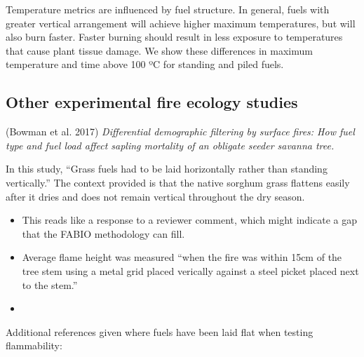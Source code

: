 \documentclass[11pt,a4paper]{article}
\begin{document}
Temperature metrics are influenced by fuel structure. In general, fuels
with greater vertical arrangement will achieve higher maximum
temperatures, but will also burn faster. Faster burning should result in
less exposure to temperatures that cause plant tissue damage. We show
these differences in maximum temperature and time above 100 ºC for
standing and piled fuels.

\hypertarget{other-experimental-fire-ecology-studies}{%
\subsection{Other experimental fire ecology
studies}\label{other-experimental-fire-ecology-studies}}

(Bowman et al. 2017) \emph{Differential demographic filtering by surface
fires: How fuel type and fuel load affect sapling mortality of an
obligate seeder savanna tree.}

In this study, ``Grass fuels had to be laid horizontally rather than
standing vertically.'' The context provided is that the native sorghum
grass flattens easily after it dries and does not remain vertical
throughout the dry season.

\begin{itemize}
\item
  This reads like a response to a reviewer comment, which might indicate
  a gap that the FABIO methodology can fill.
\item
  Average flame height was measured ``when the fire was within 15cm of
  the tree stem using a metal grid placed verically against a steel
  picket placed next to the stem.''
\item
\end{itemize}

Additional references given where fuels have been laid flat when testing
flammability:
\end{document}
